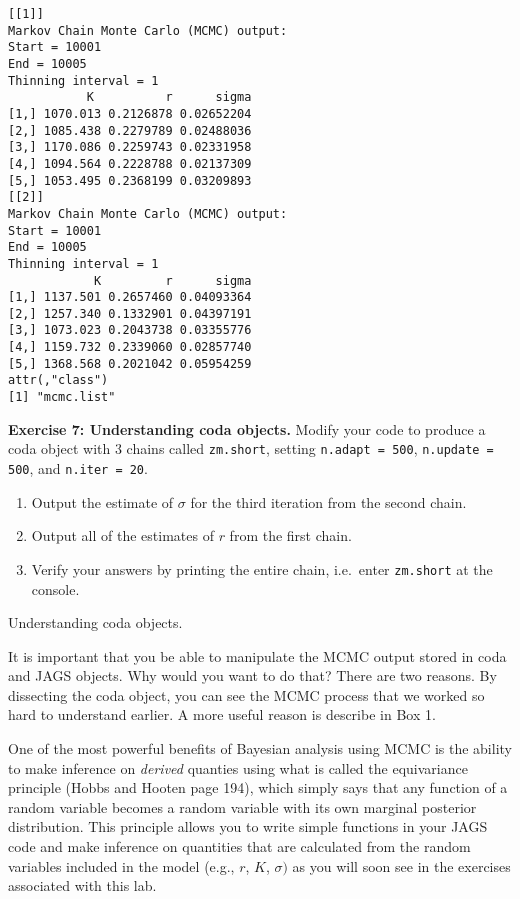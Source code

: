 \documentclass[12pt,english]{article}
\begin{document}
{\begin{Verbatim}[fontsize=\small]
[[1]]
Markov Chain Monte Carlo (MCMC) output:
Start = 10001
End = 10005
Thinning interval = 1
           K          r      sigma
[1,] 1070.013 0.2126878 0.02652204
[2,] 1085.438 0.2279789 0.02488036
[3,] 1170.086 0.2259743 0.02331958
[4,] 1094.564 0.2228788 0.02137309
[5,] 1053.495 0.2368199 0.03209893
[[2]]
Markov Chain Monte Carlo (MCMC) output:
Start = 10001
End = 10005
Thinning interval = 1
            K         r      sigma
[1,] 1137.501 0.2657460 0.04093364
[2,] 1257.340 0.1332901 0.04397191
[3,] 1073.023 0.2043738 0.03355776
[4,] 1159.732 0.2339060 0.02857740
[5,] 1368.568 0.2021042 0.05954259
attr(,"class")
[1] "mcmc.list"
\end{Verbatim}

\belowcaptionskip=-30pt
\begin{exercise}
\begin{mdframed}
\doublespacing
\textbf{Exercise 7: Understanding coda objects.} Modify your code to produce a coda object with 3 chains called \texttt{zm.short}, setting \texttt{n.adapt = 500}, \texttt{n.update = 500}, and \texttt{n.iter = 20}.
\begin{enumerate}
\item Output the estimate of $\sigma$ for the third iteration from the second chain.
\item Output all of the estimates of $r$ from the first chain.
\item Verify your answers by printing the entire chain, i.e.\ enter \texttt{zm.short} at the console.
\end{enumerate}
\end{mdframed}
\captionsetup{textformat=empty, labelformat=empty}
\caption[Understanding coda objects]{Understanding coda objects.}
\label{ex:coda understanding}
\end{exercise}
\belowcaptionskip=0pt

It is important that you be able to manipulate the MCMC output stored in coda and JAGS objects. Why would you want to do that? There are two reasons. By dissecting the coda object, you can see the MCMC process that we worked so hard to understand earlier. A more useful reason is describe in Box 1.

\newpage 

\begin{mdframed}[frametitle={Box 1: Using R to calculate derived quantities from MCMC objects}, backgroundcolor=black!10]
One of the most powerful benefits of Bayesian analysis using MCMC is the ability to make inference on \emph{derived} quanties using what is called the equivariance principle (Hobbs and Hooten \citeyearpar{hobbs2015bayesian} page 194), which simply says that any function of a random variable becomes a random variable with its own marginal posterior distribution. This principle allows you to write simple functions in your JAGS code and make inference on quantities that are calculated from the random variables included in the model (e.g., $r$, $K$, $\sigma)$ as you will soon see in the exercises associated with this lab. 


\end{mdframed}}
\end{document}
